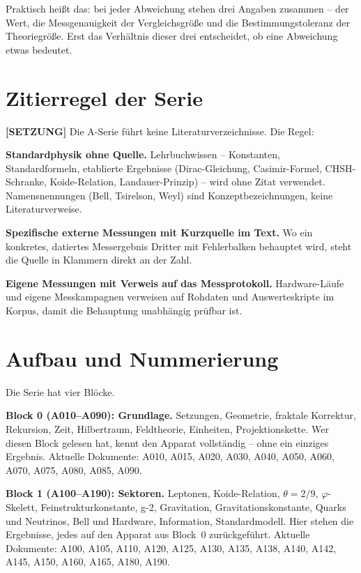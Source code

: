 Praktisch heißt das: bei jeder Abweichung stehen drei Angaben zusammen -- der
Wert, die Messgenauigkeit der Vergleichsgröße und die Bestimmungstoleranz der
Theoriegröße. Erst das Verhältnis dieser drei entscheidet, ob eine Abweichung
etwas bedeutet.

\section{Zitierregel der Serie}

\textbf{[SETZUNG]} Die A-Serie führt keine Literaturverzeichnisse. Die Regel:

\textbf{Standardphysik ohne Quelle.} Lehrbuchwissen -- Konstanten, Standardformeln,
etablierte Ergebnisse (Dirac-Gleichung, Casimir-Formel, CHSH-Schranke,
Koide-Relation, Landauer-Prinzip) -- wird ohne Zitat verwendet. Namensnennungen
(Bell, Tsirelson, Weyl) sind Konzeptbezeichnungen, keine Literaturverweise.

\textbf{Spezifische externe Messungen mit Kurzquelle im Text.} Wo ein konkretes,
datiertes Messergebnis Dritter mit Fehlerbalken behauptet wird, steht die
Quelle in Klammern direkt an der Zahl.

\textbf{Eigene Messungen mit Verweis auf das Messprotokoll.} Hardware-Läufe
und eigene Messkampagnen verweisen auf Rohdaten und Auswerteskripte im Korpus,
damit die Behauptung unabhängig prüfbar ist.

\section{Aufbau und Nummerierung}

Die Serie hat vier Blöcke.

\textbf{Block 0 (A010--A090): Grundlage.} Setzungen, Geometrie, fraktale
Korrektur, Rekursion, Zeit, Hilbertraum, Feldtheorie, Einheiten, Projektionskette.
Wer diesen Block gelesen hat, kennt den Apparat vollständig -- ohne ein einziges
Ergebnis. Aktuelle Dokumente: A010, A015, A020, A030, A040, A050, A060, A070,
A075, A080, A085, A090.

\textbf{Block 1 (A100--A190): Sektoren.} Leptonen, Koide-Relation,
$\theta = 2/9$, $\varphi$-Skelett, Feinstrukturkonstante, g-2, Gravitation, Gravitationskonstante,
Quarks und Neutrinos, Bell und Hardware, Information, Standardmodell. Hier
stehen die Ergebnisse, jedes auf den Apparat aus Block~0 zurückgeführt.
Aktuelle Dokumente: A100, A105, A110, A120, A125, A130, A135, A138, A140, A142,
A145, A150, A160, A165, A180, A190.

